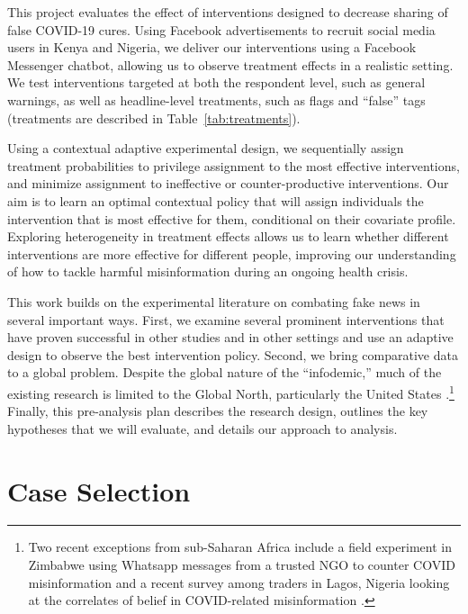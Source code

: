 \documentclass[letterpaper, 12pt, parskip=full,DIV=12]{scrartcl}
\begin{document}
This project evaluates the effect of interventions designed to decrease sharing of false COVID-19 cures. Using Facebook advertisements to recruit social media users in Kenya and Nigeria, we deliver our interventions using a Facebook Messenger chatbot, allowing us to observe treatment effects in a realistic setting. We test interventions targeted at both the respondent level, such as general warnings, as well as headline-level treatments, such as flags and ``false'' tags (treatments are described in Table~\ref{tab:treatments}). 

Using a contextual adaptive experimental design, we sequentially assign treatment probabilities to privilege assignment to the most effective interventions, and minimize assignment to ineffective or counter-productive interventions. Our aim is to learn an optimal contextual policy that will assign individuals the intervention that is most effective for them, conditional on their covariate profile. Exploring heterogeneity in treatment effects allows us to learn whether different interventions are more effective for different people, improving our understanding of how to tackle harmful misinformation during an ongoing health crisis. 

This work builds on the experimental literature on combating fake news in several important ways. First, we examine several prominent interventions that have proven successful in other studies and in other settings and use an adaptive design to observe the best intervention policy. Second, we bring comparative data to a global problem. Despite the global nature of the ``infodemic,'' much of the existing research is limited to the Global North, particularly the United States \citep{pennycook2020fighting, bursztyn2020misinformation}.\footnote{Two recent exceptions from sub-Saharan Africa include a field experiment in Zimbabwe using Whatsapp messages from a trusted NGO  to counter COVID misinformation \citep{bowles2020center} and a recent survey among traders in Lagos, Nigeria looking at the correlates of belief in COVID-related misinformation \citep{Grossman2020}.} Finally, this pre-analysis plan describes the research design, outlines the key hypotheses that we will evaluate, and details our approach to analysis.




\section{Case Selection}
\end{document}
